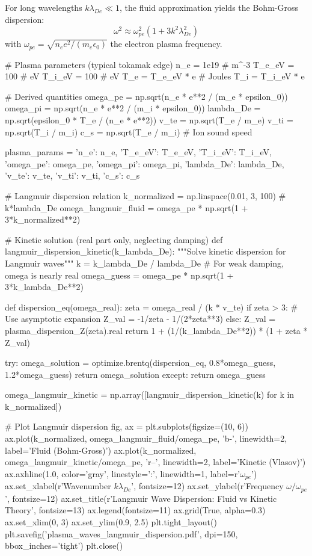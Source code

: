 \documentclass[11pt,a4paper]{article}
\begin{document}
For long wavelengths $k \lambda_{De} \ll 1$, the fluid approximation yields the Bohm-Gross dispersion:
\begin{equation}
\omega^2 \approx \omega_{pe}^2 \left(1 + 3k^2 \lambda_{De}^2\right)
\end{equation}
with $\omega_{pe} = \sqrt{n_e e^2/(m_e \epsilon_0)}$ the electron plasma frequency.

\begin{pycode}
# Plasma parameters (typical tokamak edge)
n_e = 1e19  # m^-3
T_e_eV = 100  # eV
T_i_eV = 100  # eV
T_e = T_e_eV * e  # Joules
T_i = T_i_eV * e

# Derived quantities
omega_pe = np.sqrt(n_e * e**2 / (m_e * epsilon_0))
omega_pi = np.sqrt(n_e * e**2 / (m_i * epsilon_0))
lambda_De = np.sqrt(epsilon_0 * T_e / (n_e * e**2))
v_te = np.sqrt(T_e / m_e)
v_ti = np.sqrt(T_i / m_i)
c_s = np.sqrt(T_e / m_i)  # Ion sound speed

plasma_params = {
    'n_e': n_e,
    'T_e_eV': T_e_eV,
    'T_i_eV': T_i_eV,
    'omega_pe': omega_pe,
    'omega_pi': omega_pi,
    'lambda_De': lambda_De,
    'v_te': v_te,
    'v_ti': v_ti,
    'c_s': c_s
}

# Langmuir dispersion relation
k_normalized = np.linspace(0.01, 3, 100)  # k*lambda_De
omega_langmuir_fluid = omega_pe * np.sqrt(1 + 3*k_normalized**2)

# Kinetic solution (real part only, neglecting damping)
def langmuir_dispersion_kinetic(k_lambda_De):
    """Solve kinetic dispersion for Langmuir waves"""
    k = k_lambda_De / lambda_De
    # For weak damping, omega is nearly real
    omega_guess = omega_pe * np.sqrt(1 + 3*k_lambda_De**2)

    def dispersion_eq(omega_real):
        zeta = omega_real / (k * v_te)
        if zeta > 3:  # Use asymptotic expansion
            Z_val = -1/zeta - 1/(2*zeta**3)
        else:
            Z_val = plasma_dispersion_Z(zeta).real
        return 1 + (1/(k_lambda_De**2)) * (1 + zeta * Z_val)

    try:
        omega_solution = optimize.brentq(dispersion_eq,
                                         0.8*omega_guess, 1.2*omega_guess)
        return omega_solution
    except:
        return omega_guess

omega_langmuir_kinetic = np.array([langmuir_dispersion_kinetic(k)
                                   for k in k_normalized])

# Plot Langmuir dispersion
fig, ax = plt.subplots(figsize=(10, 6))
ax.plot(k_normalized, omega_langmuir_fluid/omega_pe, 'b-',
        linewidth=2, label='Fluid (Bohm-Gross)')
ax.plot(k_normalized, omega_langmuir_kinetic/omega_pe, 'r--',
        linewidth=2, label='Kinetic (Vlasov)')
ax.axhline(1.0, color='gray', linestyle=':', linewidth=1,
           label=r'$\omega_{pe}$')
ax.set_xlabel(r'Wavenumber $k\lambda_{De}$', fontsize=12)
ax.set_ylabel(r'Frequency $\omega/\omega_{pe}$', fontsize=12)
ax.set_title(r'Langmuir Wave Dispersion: Fluid vs Kinetic Theory',
             fontsize=13)
ax.legend(fontsize=11)
ax.grid(True, alpha=0.3)
ax.set_xlim(0, 3)
ax.set_ylim(0.9, 2.5)
plt.tight_layout()
plt.savefig('plasma_waves_langmuir_dispersion.pdf', dpi=150, bbox_inches='tight')
plt.close()
\end{pycode}
\end{document}
